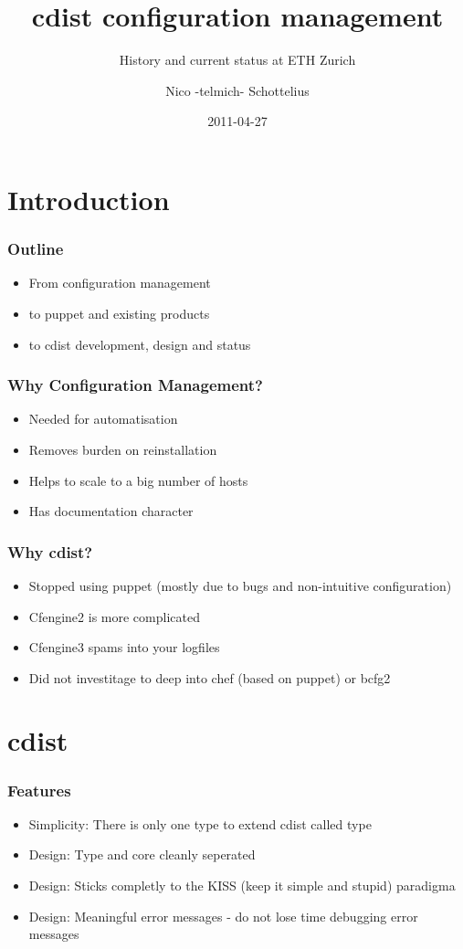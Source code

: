 \documentclass{beamer}
\title{cdist configuration management}
\subtitle{History and current status at ETH Zurich}
\author{Nico -telmich- Schottelius}
\date{2011-04-27}
\begin{document}
\frame{\titlepage}
\section[Outline]{}
\frame{\tableofcontents}


\section{Introduction}
\frame
{
  \frametitle{Outline}
   \begin{itemize}
      \item From configuration management
      \item to puppet and existing products
      \item to cdist development, design and status
   \end{itemize}
}

\frame
{
  \frametitle{Why Configuration Management?}
   \begin{itemize}
      \item Needed for automatisation
      \item Removes burden on reinstallation
      \item Helps to scale to a big number of hosts
      \item Has documentation character
   \end{itemize}
}

\frame
{
  \frametitle{Why cdist?}
   \begin{itemize}
      \item Stopped using puppet (mostly due to bugs and non-intuitive configuration)
      \item Cfengine2 is more complicated
      \item Cfengine3 spams into your logfiles
      \item Did not investitage to deep into chef (based on puppet) or bcfg2
   \end{itemize}
}

\section{cdist}
\begin{frame}
   \frametitle{Features}
   \begin{itemize}
\item Simplicity:  There is only one type to extend cdist called type
\item Design:  Type and core cleanly seperated
\item Design:  Sticks completly to the KISS (keep it simple and stupid) paradigma
\item Design:  Meaningful error messages - do not lose time debugging error messages
   \end{itemize}
\end{frame}
\end{document}
